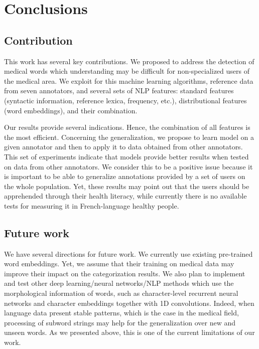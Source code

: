 \chapter{Conclusions}
\label{ch:conclusions}

\section{Contribution}
This work has several key contributions.
We proposed to address the detection of medical words which understanding may be difficult for non-specialized users of the medical area. We exploit for this machine learning algorithms,
reference data from seven annotators, and several sets of NLP features: standard features (syntactic information, reference lexica, frequency, etc.), distributional features (word embeddings), and their
combination.

Our results provide several indications.
Hence, the combination of all features is the most efficient.
Concerning the generalization, we propose to learn model on a given
annotator and then to apply it to data obtained from other annotators.
This set of experiments indicate that models provide better results
when tested on data from other annotators.
We consider this to be a positive issue because it is important to be
able to generalize annotations provided by a set of users on the whole
population.
Yet, these results may point out that the users should be apprehended
through their health literacy, while currently there is no available
tests for measuring it in French-language healthy people.

\section{Future work}
We have several directions for future work. We currently use existing pre-trained word embeddings. Yet, we assume that their training on medical data may improve their impact on the categorization results. We also plan to implement and test other deep learning/neural networks/NLP methods which use the morphological information of words, such as character-level recurrent neural networks and character embeddings together with 1D convolutions. Indeed, when language data present stable patterns, which is the case in the medical field, processing of subword strings may help for the generalization over new and unseen words. As we presented above, this is one of the current limitations of our work. 